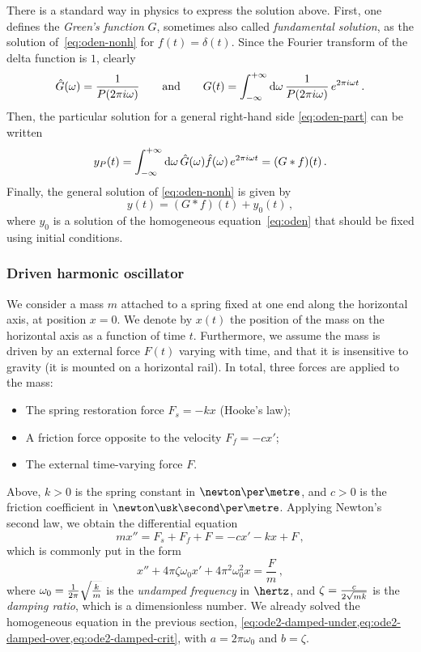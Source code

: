 There is a standard way in physics to express the solution above. First, one defines the
\emph{Green's function} $G$, sometimes also called \emph{fundamental solution}, as the
solution of~\cref{eq:oden-nonh} for $f(t)=\delta(t)$. Since the Fourier transform of the
delta function is $1$, clearly
\begin{equation}
  \hat{G}(\omega)=\frac{1}{P(2\pi i\omega)}\qquad\text{and}\qquad
  G(t)=\int_{-\infty}^{+\infty}\mathrm{d}{\omega}\,\frac{1}{P(2\pi i\omega)}\,e^{2\pi i \omega t}\,.
  \label{eq:green-ft}
\end{equation}
Then, the particular solution for a general right-hand side \cref{eq:oden-part} can be
written
\begin{equation}
  \label{eq:oden-part-conv}
  y_P(t)=\int_{-\infty}^{+\infty}\mathrm{d}{\omega}\,\hat{G}(\omega)\hat{f}(\omega)\,e^{2\pi i\omega t}
  =(G\ast f)(t)\,.
\end{equation}
Finally, the general solution of \cref{eq:oden-nonh} is given by
\begin{equation}
  y(t)=(G\ast f)(t)+y_0(t)\,,
\end{equation}
where $y_0$ is a solution of the homogeneous equation~\cref{eq:oden} that should be fixed
using initial conditions.
\subsubsection{Driven harmonic oscillator}
We consider a mass $m$ attached to a spring fixed at one end along the horizontal axis,
at position $x=0$. We denote by $x(t)$ the position of the mass on the horizontal axis as
a function of time $t$. Furthermore, we assume the mass is driven by an external force
$F(t)$ varying with time, and that it is insensitive to gravity (\eg it is mounted on a
horizontal rail). In total, three forces are applied to the mass:
\begin{itemize}
  \item The spring restoration force $F_s=-kx$ (Hooke's law);
  \item A friction force opposite to the velocity $F_f=-cx'$;
  \item The external time-varying force $F$.
\end{itemize}
Above, $k>0$ is the spring constant in $\newton\per\metre$, and $c>0$ is the friction
coefficient in $\newton\usk\second\per\metre$. Applying Newton's second law, we obtain the
differential equation
\begin{equation}
  mx''=F_s+F_f+F=-cx'-kx+F\,,
\end{equation}
which is commonly put in the form
\begin{equation}
  x''+4\pi\zeta\omega_0x'+4\pi^2\omega_0^2x=\frac{F}{m}\,,\label{eq:ode2-driven}
\end{equation}
where $\omega_0=\smash{\frac{1}{2\pi}\sqrt{\frac{k}{m}}}$ is the \emph{undamped frequency}
in $\hertz$, and $\zeta=\smash{\frac{c}{2\sqrt{mk}}}$ is the \emph{damping ratio}, which
is a dimensionless number. We already solved the homogeneous equation in the previous
section, \cf\cref{eq:ode2-damped-under,eq:ode2-damped-over,eq:ode2-damped-crit}, with
$a=2\pi\omega_0$ and $b=\zeta$.

